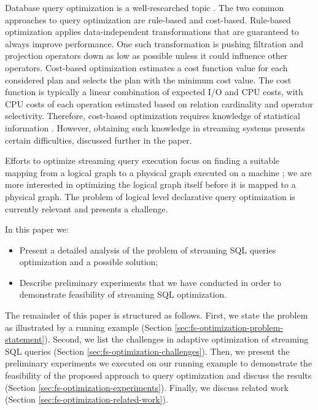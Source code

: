 Database query optimization is a well-researched topic \cite{astrahan1976system, haas1989extensible, graefe1993volcano}. 
The two common approaches to query optimization are rule-based and cost-based. Rule-based optimization applies data-independent transformations that are guaranteed to always improve performance. One such transformation is pushing filtration and projection operators down as low as possible unless it could influence other operators. Cost-based optimization estimates a cost function value for each considered plan and selects the plan with the minimum cost value. The cost function is typically a linear combination of expected I/O and CPU costs, with CPU costs of each operation estimated based on relation cardinality and operator selectivity. Therefore, cost-based optimization requires knowledge of statistical information \cite{Neumann2018optimization}. However, obtaining such knowledge in streaming systems presents certain difficulties, discussed further in the paper.

Efforts to optimize streaming query execution focus on finding a suitable mapping from a logical graph to a physical graph executed on a machine \cite{grulich2020grizzly, gedik2009code}; we are more interested in optimizing the logical graph itself before it is mapped to a physical graph. The problem of logical level declarative query optimization is currently relevant and presents a challenge.


In this paper we:
\begin{itemize}
    \item Present a detailed analysis of the problem of streaming SQL queries optimization and a possible solution;
    \item Describe preliminary experiments that we have conducted in order to demonstrate feasibility of streaming SQL optimization.
\end{itemize}

The remainder of this paper is structured as follows. First, we state the problem as illustrated by a running example (Section \ref{sec:fs-optimization-problem-statement}). Second, we list the challenges in adaptive optimization of streaming SQL queries (Section \ref{sec:fs-optimization-challenges}). Then, we present the preliminary experiments we executed on our running example to demonstrate the feasibility of the proposed approach to query optimization and discuss the results (Section \ref{sec:fs-optimization-experiments}). Finally, we discuss related work (Section \ref{sec:fs-optimization-related-work}).     



